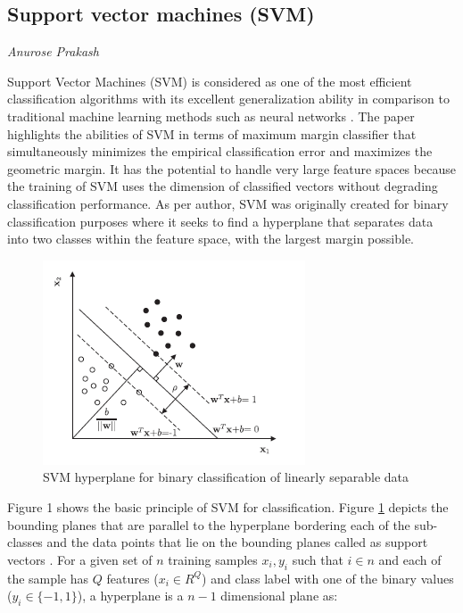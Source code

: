 \subsection{Support vector machines (SVM)}
\vspace*{-12mm}\hfill{\normalsize\emph{Anurose Prakash}}

Support Vector Machines (SVM) is considered as one of the most efficient classification algorithms with its excellent generalization ability in comparison to traditional machine learning methods such as neural networks \cite{Kim2010MachinePB}. The paper highlights the abilities of SVM in terms of maximum margin classifier that simultaneously minimizes the empirical classification error and maximizes the geometric margin. It has the potential to handle very large feature spaces because the training of SVM uses the dimension of classified vectors without degrading classification performance. As per author, SVM was originally created for binary classification purposes where it seeks to find a hyperplane that separates data into two classes within the feature space, with the largest margin possible. 
\begin{figure}[ht]
	\centering
	\includegraphics[scale=1.0]{gfx/SVM_1.PNG}
    \captionsetup{justification=centering}
	\caption{SVM hyperplane for binary classification of linearly separable data}
	\label{fig:SVM structure}
\end{figure}
Figure 1 \cite{DBLP:journals/tist/ChangL11} shows the basic principle of SVM for classification. Figure \ref{fig:SVM structure} depicts the bounding planes that are parallel to the hyperplane bordering each of the sub-classes and the data points that lie on the bounding planes called as support vectors \cite{DBLP:journals/tist/ChangL11}. For a given set of $n$ training samples ${x_i, y_i}$ such that $i \in n$ and each of the sample has $Q$ features ($x_i \in R^Q$) and class label with one of the binary values ($y_i \in \{-1, 1\}$), a hyperplane is a $n-1$ dimensional plane as:

